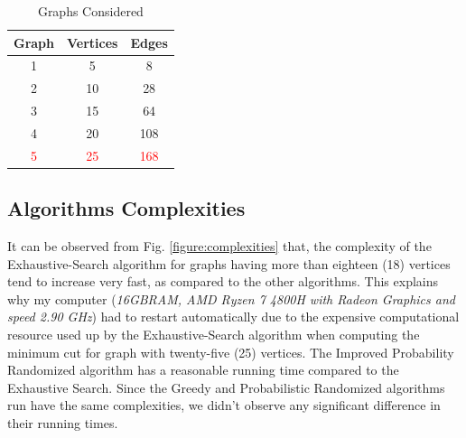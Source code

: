 \documentclass[longpaper, english, final, times]{revdetua}
\begin{document}
			\begin{table}[h]
				\caption{Graphs Considered}
				\label{table:graphsconsidered}
				{\renewcommand{\arraystretch}{2}
					\begin{center}
					\begin{tabular}{|c|c|c|}
						\hline
						Graph&Vertices&Edges \\
						\hline
						1&5&8\\
						\hline
						2&10&28\\
						\hline
						3&15&64\\
						\hline
						4&20&108\\
						\hline
						\textcolor{red}{5}&\textcolor{red}{25}&\textcolor{red}{168}\\
						\hline
					\end{tabular}
				\end{center}
				}
			\end{table}
		
		\subsection{Algorithms Complexities}
			It can be observed from Fig. \ref{figure:complexities} that, the complexity of the Exhaustive-Search algorithm for graphs having more than eighteen (18) vertices tend to increase very fast, as compared to the other algorithms. This explains why my computer (\textit{16GBRAM, AMD Ryzen 7 4800H with Radeon Graphics and speed 2.90 GHz}) had to restart automatically due to the expensive computational resource used up by the Exhaustive-Search algorithm when computing the minimum cut for graph with twenty-five (25) vertices. The Improved Probability Randomized algorithm has a reasonable running time compared to the Exhaustive Search. Since the Greedy and Probabilistic Randomized algorithms run have the same complexities, we didn't observe any significant difference in their running times. \\ 
			
\end{document}
